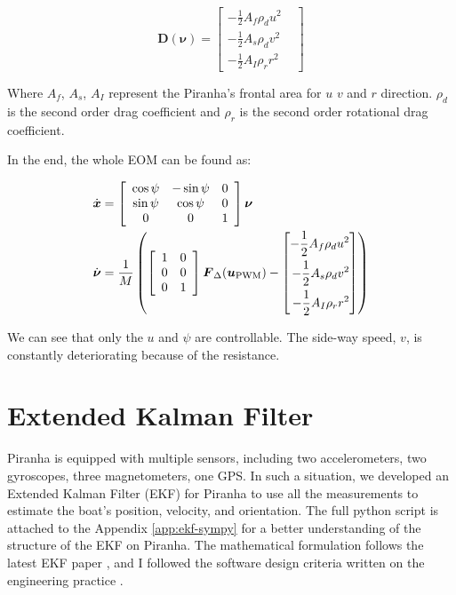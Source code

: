 \begin{equation}
    \boldsymbol{D}(\boldsymbol{\nu})=\left[\begin{aligned}
        -\frac{1}{2}A_f \rho_d u^2 & \\
        -\frac{1}{2}A_s \rho_d v^2 & \\
        -\frac{1}{2}A_I \rho_r r^2 &
    \end{aligned}\right]
\end{equation}

Where $A_f$, $A_s$, $A_I$ represent the Piranha's frontal area for $u$ $v$ and $r$ direction. $\rho_d$ is the second order drag coefficient and $\rho_r$ is the second order rotational drag coefficient.

In the end, the whole EOM can be found as:

\begin{align}
    \dot{\boldsymbol{x}} & =\left[\begin{array}{ccc}
        \cos{\psi} & -\sin{\psi} & 0  \\
        \sin{\psi} & \cos{\psi} & 0 \\
        0 & 0 & 1
    \end{array}\right]\boldsymbol{\nu} \\
    \dot{\boldsymbol{\nu}} & =\frac{1}{M}\left(\left[\begin{array}{cc}
        1 & 0 \\
        0 & 0\\
        0 & 1 
    \end{array}\right]\boldsymbol{F}_\Delta(\boldsymbol{u}_{\rm PWM})-\left[\begin{aligned}
        -\frac{1}{2}A_f \rho_d u^2 & \\
        -\frac{1}{2}A_s \rho_d v^2 & \\
        -\frac{1}{2}A_I \rho_r r^2 &
    \end{aligned}\right]\right)
\end{align}

We can see that only the $u$ and $\psi$ are controllable. The side-way speed, $v$, is constantly deteriorating because of the resistance.

\section{Extended Kalman Filter}

Piranha is equipped with multiple sensors, including two accelerometers, two gyroscopes, three magnetometers, one GPS. In such a situation, we developed an Extended Kalman Filter (EKF) for Piranha to use all the measurements to estimate the boat's position, velocity, and orientation. The full python script is attached to the Appendix \ref{app:ekf-sympy} for a better understanding of the structure of the EKF on Piranha. The mathematical formulation follows the latest EKF paper \cite{bortz1971new}, and I followed the software design criteria written on the engineering practice \cite{savage1998strapdown1, savage1998strapdown2}.

